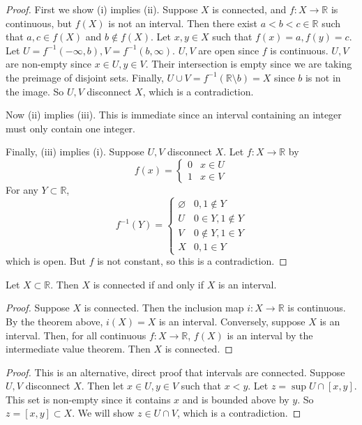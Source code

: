 \begin{proof}
	First we show (i) implies (ii).
	Suppose \( X \) is connected, and \( f \colon X \to \mathbb R \) is continuous, but \( f(X) \) is not an interval.
	Then there exist \( a<b<c \in \mathbb R \) such that \( a,c \in f(X) \) and \( b \not\in f(X) \).
	Let \( x,y \in X \) such that \( f(x) = a, f(y) = c \).
	Let \( U = f^{-1}(-\infty, b), V = f^{-1}(b,\infty) \).
	\( U, V \) are open since \( f \) is continuous.
	\( U, V \) are non-empty since \( x \in U, y \in V \).
	Their intersection is empty since we are taking the preimage of disjoint sets.
	Finally, \( U \cup V = f^{-1}(\mathbb R \setminus b) = X \) since \( b \) is not in the image.
	So \( U, V \) disconnect \( X \), which is a contradiction.

	Now (ii) implies (iii).
	This is immediate since an interval containing an integer must only contain one integer.

	Finally, (iii) implies (i).
	Suppose \( U, V \) disconnect \( X \).
	Let \( f \colon X \to \mathbb R \) by
	\[
		f(x) = \begin{cases}
			0 & x \in U \\
			1 & x \in V
		\end{cases}
	\]
	For any \( Y \subset \mathbb R \),
	\[
		f^{-1}(Y) = \begin{cases} \varnothing & 0,1 \not\in Y      \\
              U           & 0\in Y, 1\not\in Y \\
              V           & 0\not\in Y, 1\in Y \\
              X           & 0,1 \in Y
		\end{cases}
	\]
	which is open.
	But \( f \) is not constant, so this is a contradiction.
\end{proof}
\begin{corollary}
	Let \( X \subset \mathbb R \).
	Then \( X \) is connected if and only if \( X \) is an interval.
\end{corollary}
\begin{proof}
	Suppose \( X \) is connected.
	Then the inclusion map \( i \colon X \to \mathbb R \) is continuous.
	By the theorem above, \( i(X) = X \) is an interval.
	Conversely, suppose \( X \) is an interval.
	Then, for all continuous \( f \colon X \to \mathbb R \), \( f(X) \) is an interval by the intermediate value theorem.
	Then \( X \) is connected.
\end{proof}
\begin{proof}
	This is an alternative, direct proof that intervals are connected.
	Suppose \( U, V \) disconnect \( X \).
	Then let \( x \in U, y \in V \) such that \( x < y \).
	Let \( z = \sup U \cap [x,y] \).
	This set is non-empty since it contains \( x \) and is bounded above by \( y \).
	So \( z = [x,y] \subset X \).
	We will show \( z \in U \cap V \), which is a contradiction.
\end{proof}

